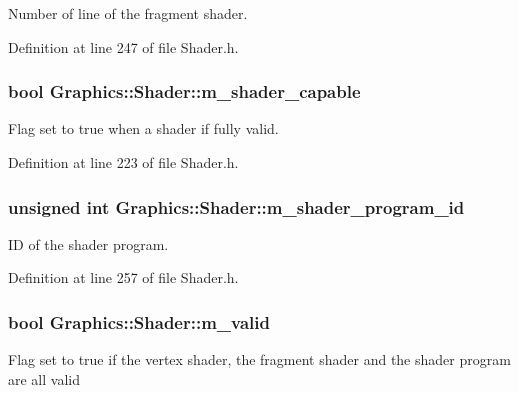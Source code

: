 Number of line of the fragment shader. 



Definition at line 247 of file Shader.h.

\hypertarget{class_graphics_1_1_shader_a2e7ae863654c0f94813ab51698740f99}{
\subsubsection[{m\_\-shader\_\-capable}]{\setlength{\rightskip}{0pt plus 5cm}bool {\bf Graphics::Shader::m\_\-shader\_\-capable}}}
\label{class_graphics_1_1_shader_a2e7ae863654c0f94813ab51698740f99}


Flag set to true when a shader if fully valid. 



Definition at line 223 of file Shader.h.

\hypertarget{class_graphics_1_1_shader_ab648e2b9fcc45d291890836ee158fd02}{
\subsubsection[{m\_\-shader\_\-program\_\-id}]{\setlength{\rightskip}{0pt plus 5cm}unsigned int {\bf Graphics::Shader::m\_\-shader\_\-program\_\-id}}}
\label{class_graphics_1_1_shader_ab648e2b9fcc45d291890836ee158fd02}


ID of the shader program. 



Definition at line 257 of file Shader.h.

\hypertarget{class_graphics_1_1_shader_a06900d31b8c7f91a1f2090156e0177c5}{
\subsubsection[{m\_\-valid}]{\setlength{\rightskip}{0pt plus 5cm}bool {\bf Graphics::Shader::m\_\-valid}}}
\label{class_graphics_1_1_shader_a06900d31b8c7f91a1f2090156e0177c5}
Flag set to true if the vertex shader, the fragment shader and the shader program are all valid 

